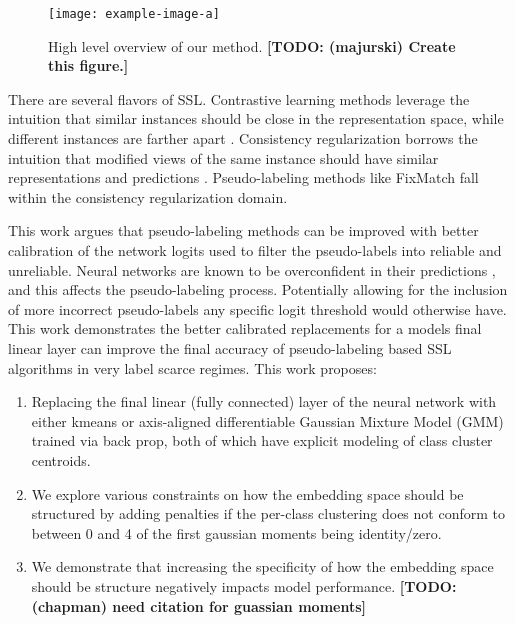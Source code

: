 \documentclass[10pt,twocolumn,letterpaper]{article}
\newcommand{\TODO}[1]{\textbf{\color{red}[TODO: #1]}}
\begin{document}
\begin{figure}[ht]
	\centering
	\texttt{[image: example-image-a]}
	\caption{High level overview of our method. \TODO {(majurski) Create this figure.}}
	\label{fig:schema}
\end{figure}

There are several flavors of SSL.
Contrastive learning methods leverage the intuition that similar instances should be close in the representation space, while different instances are farther apart \cite{yang2022class,li2021comatch}.
Consistency regularization borrows the intuition that modified views of the same instance should have similar representations and predictions \cite{sohn2020fixmatch,lee2022contrastive,zhang2021flexmatch,kim2022conmatch}.
Pseudo-labeling methods like FixMatch \cite{sohn2020fixmatch} fall within the consistency regularization domain.

This work argues that pseudo-labeling methods can be improved with better calibration of the network logits used to filter the pseudo-labels into reliable and unreliable. 
Neural networks are known to be overconfident in their predictions \cite{wei2022mitigating}, and this affects the pseudo-labeling process. 
Potentially allowing for the inclusion of more incorrect pseudo-labels any specific logit threshold would otherwise have.
This work demonstrates the better calibrated replacements for a models final linear layer can improve the final accuracy of pseudo-labeling based SSL algorithms in very label scarce regimes. 
This work proposes:

\begin{enumerate}
	\item Replacing the final linear (fully connected) layer of the neural network with either kmeans \cite{dwibedi2021little} or axis-aligned differentiable Gaussian Mixture Model (GMM) trained via back prop, both of which have explicit modeling of class cluster centroids. 
	\item We explore various constraints on how the embedding space should be structured by adding penalties if the per-class clustering does not conform to between 0 and 4 of the first gaussian moments being identity/zero.
	\item We demonstrate that increasing the specificity of how the embedding space should be structure negatively impacts model performance. \TODO {(chapman) need citation for guassian moments}
\end{enumerate}
\end{document}

